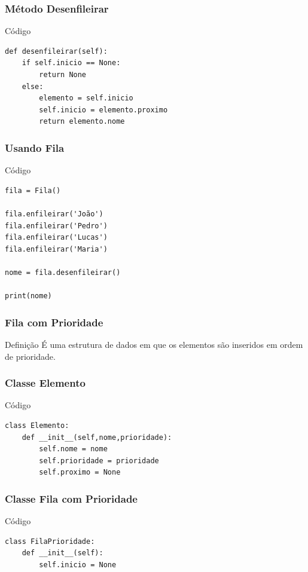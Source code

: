 \documentclass{beamer}
\begin{document}
\begin{frame}[fragile]
\frametitle{Método Desenfileirar}

\begin{exampleblock}{Código}
	\begin{lstlisting}
def desenfileirar(self):
    if self.inicio == None:
        return None
    else:
        elemento = self.inicio
        self.inicio = elemento.proximo
        return elemento.nome
	\end{lstlisting}
\end{exampleblock}
\end{frame}

\begin{frame}[fragile]
\frametitle{Usando Fila}

\begin{exampleblock}{Código}
	\begin{lstlisting}
fila = Fila()

fila.enfileirar('João')
fila.enfileirar('Pedro')
fila.enfileirar('Lucas')
fila.enfileirar('Maria')

nome = fila.desenfileirar()

print(nome)
	\end{lstlisting}
\end{exampleblock}
\end{frame}

\begin{frame}
\frametitle{Fila com Prioridade}

\begin{block}{Definição}
É uma estrutura de dados em que os elementos são inseridos em ordem de prioridade.
\end{block}
\end{frame}

\begin{frame}[fragile]
\frametitle{Classe Elemento}

\begin{exampleblock}{Código}
\begin{lstlisting}
class Elemento:
    def __init__(self,nome,prioridade):
        self.nome = nome
        self.prioridade = prioridade
        self.proximo = None
\end{lstlisting}
\end{exampleblock}
\end{frame}

\begin{frame}[fragile]
\frametitle{Classe Fila com Prioridade}

\begin{exampleblock}{Código}
\begin{lstlisting}
class FilaPrioridade:
    def __init__(self):
        self.inicio = None
\end{lstlisting}
\end{exampleblock}
\end{frame}
\end{document}
